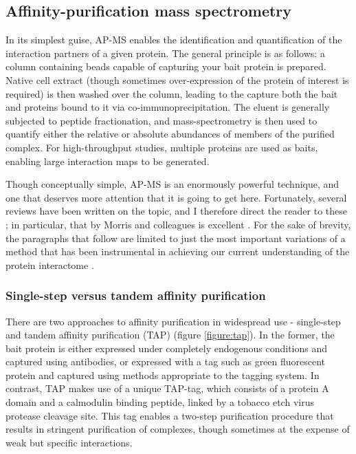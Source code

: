 \documentclass[a4paper,11pt,twoside,openright]{scrbook}
\begin{document}
\subsection{Affinity-purification mass spectrometry}
In its simplest guise, AP-MS enables the identification and quantification of the interaction partners of a given protein. The general principle is as follows: a column containing beads capable of capturing your bait protein is prepared. Native cell extract (though sometimes over-expression of the protein of interest is required) is then washed over the column, leading to the capture both the bait and proteins bound to it via co-immunoprecipitation. The eluent is generally subjected to peptide fractionation, and mass-spectrometry is then used to quantify either the relative or absolute abundances of members of the purified complex. For high-throughput studies, multiple proteins are used as baits, enabling large interaction maps to be generated.

Though conceptually simple, AP-MS is an enormously powerful technique, and one that deserves more attention that it is going to get here. Fortunately, several reviews have been written on the topic, and I therefore direct the reader to these \cite{Oeffinger2012,Morris2014,Aebersold2016}; in particular, that by Morris and colleagues is excellent \cite{Morris2014}. For the sake of brevity, the paragraphs that follow are limited to just the most important variations of a method that has been instrumental in achieving our current understanding of the protein interactome \cite{Malovannaya2011,Hein2015,Huttlin2015,Wan2015}.

\subsubsection{Single-step versus tandem affinity purification}
There are two approaches to affinity purification in widespread use - single-step and tandem affinity purification \cite{Rigaut1999} (TAP) (figure \ref{figure:tap}). In the former, the bait protein is either expressed under completely endogenous conditions and captured using antibodies, or expressed with a tag such as green fluorescent protein \cite{Hubner2010} and captured using methods appropriate to the tagging system. In contrast, TAP makes use of a unique TAP-tag, which consists of a protein A domain and a calmodulin binding peptide, linked by a tobacco etch virus protease cleavage site. This tag enables a two-step purification procedure that results in stringent purification of complexes, though sometimes at the expense of weak but specific interactions.
\end{document}
